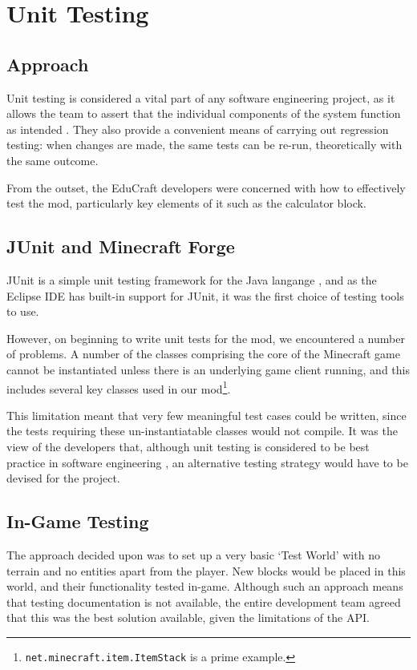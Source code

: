 \chapter{Unit Testing}
\label{apdx:unit-tests}

\section{Approach}
Unit testing is considered a vital part of any software engineering
project, as it allows the team to assert that the individual components
of the system function as intended \cite{sommerville11}. They also
provide a convenient means of carrying out regression testing: when
changes are made, the same tests can be re-run, theoretically with the
same outcome.

From the outset, the EduCraft developers were concerned with how to
effectively test the mod, particularly key elements of it such as the
calculator block.

\section{JUnit and Minecraft Forge}
JUnit is a simple unit testing framework for the Java langange \cite{website:junit},
and as the Eclipse IDE has built-in support for JUnit, it was the first choice
of testing tools to use.

However, on beginning to write unit tests for the mod, we encountered
a number of problems. A number of the classes comprising the core of
the Minecraft game cannot be instantiated unless there is an underlying
game client running, and this includes several key classes used in
our mod\footnote{\texttt{net.minecraft.item.ItemStack} is a prime
example.}.

This limitation meant that very few meaningful test cases could be written,
since the tests requiring these un-instantiatable classes would not
compile. It was the view of the developers that, although unit testing is
considered to be best practice in software engineering \cite{sommerville11},
an alternative testing strategy would have to be devised for the project.

\section{In-Game Testing}
The approach decided upon was to set up a very basic `Test World'
with no terrain and no entities apart from the player. New blocks would
be placed in this world, and their functionality tested in-game.
Although such an approach means that testing documentation is
not available, the entire development team agreed that this was the
best solution available, given the limitations of the API.
